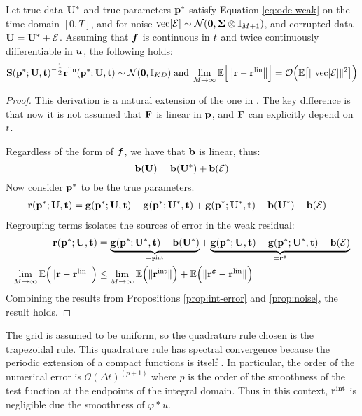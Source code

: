 \begin{lemma} \label{lemma:wres-dist}
	Let true data $\mathbf{U}^*$ and true parameters $\mathbf{p}^*$ satisfy Equation \eqref{eq:ode-weak} on the time domain $[0,T]$, and for noise $\operatorname{vec}[\mathbf{\mathcal{E}}] \sim \mathcal{N}(\mathbf{0},  \mathbf{\Sigma} \otimes \mathbb{I}_{M+1})$, and corrupted data $\mathbf{U} = \mathbf{U}^* + \mathbf{\mathcal{E}}$. Assuming that $\boldsymbol{f}$ is continuous in $t$ and twice continuously differentiable in $\boldsymbol{u}$, the following holds: 
	\[ \mathbf{S}(\mathbf{p}^*;\mathbf{U},\mathbf{t})^{-\tfrac{1}{2}}\mathbf{r}^{\mathrm{lin}}(\mathbf{p}^*; \mathbf{U}, \mathbf{t}) \sim \mathcal{N}({\mathbf{0}}, \mathbb{I}_{KD}) \; \mathrm{and} \; \lim_{M\rightarrow\infty} \mathbb{E}\Bigl[\bigl\|\mathbf{r} - \mathbf{r}^{\mathrm{lin}}\bigr\|\Bigr] = \mathcal{O}\Bigl(\mathbb{E}\bigl[\|\operatorname{vec}[\mathbf{\mathcal{E}}]\|^2\bigr]\Bigr)\]
\end{lemma}

\begin{proof}
	This derivation is a natural extension of the one in \citep{BortzMessengerDukic2023BullMathBiol}. The key difference is that now it is not assumed that $\mathbf{F}$ is linear in $\mathbf{p}$, and $\mathbf{F}$ can explicitly depend on $t$.

	Regardless of the form of $\boldsymbol{f}$, we have that $\mathbf{b}$ is linear, thus:
	\[\mathbf{b}(\mathbf{U}) = \mathbf{b}(\mathbf{U}^*) + \mathbf{b}(\mathbf{\mathcal{E}})\]
	Now consider $\mathbf{p}^*$ to be the true parameters.
	\begin{align*}
	\mathbf{r}(\mathbf{p}^*;\mathbf{U},\mathbf{t}) &= \mathbf{g}(\mathbf{p}^*;\mathbf{U},\mathbf{t}) - \mathbf{g}(\mathbf{p}^*;\mathbf{U}^*,\mathbf{t}) + \mathbf{g}(\mathbf{p}^*; \mathbf{U}^*,\mathbf{t}) - \mathbf{b}(\mathbf{U}^*) - \mathbf{b}(\mathbf{\mathcal{E}})
	\end{align*}
	Regrouping terms isolates the sources of error in the weak residual:
	\begin{align*}
		\mathbf{r}(\mathbf{p}^*;\mathbf{U},\mathbf{t}) &= \underbrace{\mathbf{g}(\mathbf{p}^*; \mathbf{U}^*,\mathbf{t}) - \mathbf{b}(\mathbf{U}^*)}_{= \mathbf{r}^\mathrm{int}} + \underbrace{\mathbf{g}(\mathbf{p}^*; \mathbf{U}, \mathbf{t}) - \mathbf{g}(\mathbf{p}^*; \mathbf{U}^*,\mathbf{t}) -\mathbf{b}(\mathbf{\mathcal{E}})}_{= \mathbf{r}^{\boldsymbol{\varepsilon}}}\\
		\lim_{M\rightarrow \infty} \mathbb{E}\Bigl( \|\mathbf{r} - \mathbf{r}^{\mathrm{lin}}\| \Bigr) &\leq \lim_{M\rightarrow \infty} \mathbb{E}\Bigl( \|\mathbf{r}^\mathrm{int}\| \Bigr) + \mathbb{E}\Bigl( \|\mathbf{r}^{\boldsymbol{\varepsilon}} - \mathbf{r}^{\mathrm{lin}}\|\Bigr)
	\end{align*}
	Combining the results from Propositions \ref{prop:int-error} and \ref{prop:noise}, the result holds. 
\end{proof}

\begin{remark}
	The grid is assumed to be uniform, so the quadrature rule chosen is the trapezoidal rule. This quadrature rule has spectral convergence because the periodic extension of a compact functions is itself \citep{Atkinson1989}. In particular, the order of the numerical error is $\mathcal{O}(\Delta t)^{(p+1)}$ where $p$ is the order of the smoothness of the test function at the endpoints of the integral domain. Thus in this context, $\mathbf{r}^\mathrm{int}$ is negligible due the smoothness of $\varphi \ast u$. 
\end{remark}

